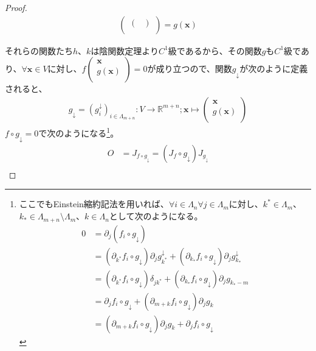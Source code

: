 \documentclass[dvipdfmx]{jsarticle}
\begin{document}
\begin{proof}
\begin{align*}
\begin{pmatrix}
\begin{pmatrix}
\end{pmatrix} \\
\end{pmatrix} = g\left( \mathbf{x} \right)
\end{align*}\par
それらの関数たち$h$、$k$は陰関数定理より$C^{1}$級であるから、その関数$g$も$C^{1}$級であり、$\forall\mathbf{x} \in V$に対し、$f\begin{pmatrix}
\mathbf{x} \\
g\left( \mathbf{x} \right) \\
\end{pmatrix} = 0$が成り立つので、関数$g_{\downarrow}$が次のように定義されると、
\begin{align*}
g_{\downarrow} = \left( g_{i}^{\downarrow} \right)_{i \in \varLambda_{m + n}}:V \rightarrow \mathbb{R}^{m + n};\mathbf{x} \mapsto \begin{pmatrix}
\mathbf{x} \\
g\left( \mathbf{x} \right) \\
\end{pmatrix}
\end{align*}
$f \circ g_{\downarrow} = 0$で次のようになる\footnote{ここでもEinstein縮約記法を用いれば、$\forall i\in \varLambda_{n} \forall j\in \varLambda_{m} $に対し、$k^{*} \in \varLambda_{m} $、$k_{*} \in \varLambda_{m+n} \setminus \varLambda_{m} $、$k\in \varLambda_{n} $として次のようになる。
\begin{align*}
0 &= \partial_{j} \left( f_{i} \circ g_{\downarrow} \right) \\
&= \left( \partial_{k^{*} } f_{i} \circ g_{\downarrow} \right) \partial_{j} g_{k^{*} }^{\downarrow} + \left( \partial_{k_{*} } f_{i} \circ g_{\downarrow} \right) \partial_{j} g_{k_{*} }^{\downarrow} \\
&= \left( \partial_{k^{*} } f_{i} \circ g_{\downarrow} \right) \delta_{j k^{*}} + \left( \partial_{k_{*} } f_{i} \circ g_{\downarrow} \right) \partial_{j} g_{k_{*} - m} \\
&= \partial_{j} f_{i} \circ g_{\downarrow} + \left( \partial_{m + k} f_{i} \circ g_{\downarrow} \right) \partial_{j} g_{k} \\
&= \left( \partial_{m + k} f_{i} \circ g_{\downarrow} \right) \partial_{j} g_{k} + \partial_{j} f_{i} \circ g_{\downarrow} 
\end{align*} }。
\begin{align*}
O &= J_{f \circ g_{\downarrow}} = \left( J_{f} \circ g_{\downarrow} \right)J_{g_{\downarrow}}\\

\end{align*}
\end{proof}
\end{document}
